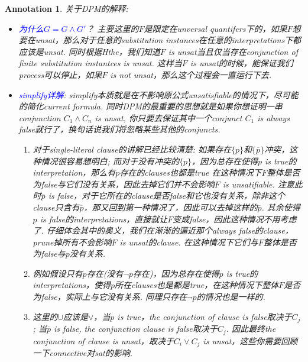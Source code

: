 \documentclass{article}
\theoremstyle{plain}
\newtheorem{annotation}[theorem]{Annotation}
\theoremstyle{nonumberplain}
\newcommand{\bluet}[1]{\textcolor{blue}{#1}}
\begin{document}
\begin{annotation}
\rm 关于DPM的解释: 
\begin{itemize}
	\item \bluet{为什么$G = G \wedge G'$}？ 主要这里的$F$是限定在unversal quantifers下的，如果$F$想要在unsat，那么对于任意的substitution instances在任意的interpretations下都应该是unsat. 同时根据Hthe，我们知道$F$ is unsat当且仅当存在conjunction of finite substitution instantces is unsat. 这样当$F$ is unsat的时候，能保证我们process可以停止，如果$F$ is not unsat，那么这个过程会一直运行下去. 
	\item \bluet{simplify详解}: simplify本质就是在不影响原公式unsatisfiable的情况下，尽可能的简化current formula. 同时DPM的最重要的思想就是如果你想证明一串conjunction $C_1 \wedge C_n$ is unsat, 你只要去保证其中一个conjunct $C_1$ is always false就行了，换句话说我们将忽略某些其他的conjuncts. 
	\begin{enumerate}
		\item 对于single-literal clause的讲解已经比较清楚: 如果存在$\{p\}$和$\{\overline{p}\}$冲突，这种情况很容易想明白; 而对于没有冲突的$\{p\}$，因为总存在使得$p$ is true的interpretation，那么有$p$存在的clauses也都是true 在这种情况下$F$整体是否为false与它们没有关系，因此去掉它们并不会影响$F$ is unsatifiable. 注意此时$\overline{p}$ is false，对于它所在的clause是否false和它也没有关系，除非这个clause只含有$\overline{p}$，那又回到第一种情况了，因此可以去掉这样的$\overline{p}$. 其余使得$p$ is false的interpretations，直接就让$F$变成false，因此这种情况不用考虑了. 仔细体会其中的奥义，我们在渐渐的逼近那个always false的clause，prune掉所有不会影响$F$ is unsat的clause.
		在这种情况下它们与$F$整体是否为false与$p$没有关系. 
		\item 例如假设只有$p$存在(没有$\neg p$存在)，因为总存在使得$p$ is true的interpretations，使得$p$所在clauses也是都是true，在这种情况下整体$F$是否为false，实际上与它没有关系. 同理只存在$\neg p$的情况也是一样的. 
		\item 这里的$\cup$应该是$\vee$，当$p$ is true，the conjunction of clause is false取决于$C_j$; 当$\overline{p}$ is false, the conjunction clause is false取决于$C_j$. 因此最终the conjunction of clause is unsat，取决于$C_i \vee C_j$ is unsat，这些你需要回顾一下connective对sat的影响.
	\end{enumerate}	
\end{itemize}
\end{annotation}
\end{document}
